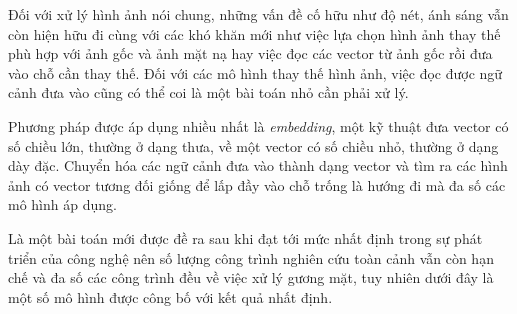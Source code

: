 \documentclass[12pt]{report}
\begin{document}
Đối với xử lý hình ảnh nói chung, những vấn đề cố hữu như độ nét, ánh sáng vẫn còn hiện hữu đi cùng với các khó khăn mới như việc lựa chọn hình ảnh thay thế phù hợp với ảnh gốc và ảnh mặt nạ hay việc đọc các vector từ ảnh gốc rồi đưa vào chỗ cần thay thế. Đối với các mô hình thay thế hình ảnh, việc đọc được ngữ cảnh đưa vào cũng có thể coi là một bài toán nhỏ cần phải xử lý.

Phương pháp được áp dụng nhiều nhất là \textit{embedding}, một kỹ thuật đưa vector có số chiều lớn, thường ở dạng thưa, về một vector có số chiều nhỏ, thường ở dạng dày đặc. Chuyển hóa các ngữ cảnh đưa vào thành dạng vector và tìm ra các hình ảnh có vector tương đối giống để lấp đầy vào chỗ trống là hướng đi mà đa số các mô hình áp dụng.

Là một bài toán mới được đề ra sau khi đạt tới mức nhất định trong sự phát triển của công nghệ nên số lượng công trình nghiên cứu toàn cảnh vẫn còn hạn chế và đa số các công trình đều về việc xử lý gương mặt, tuy nhiên dưới đây là một số mô hình được công bố với kết quả nhất định.

\vspace{1em}
\end{document}
